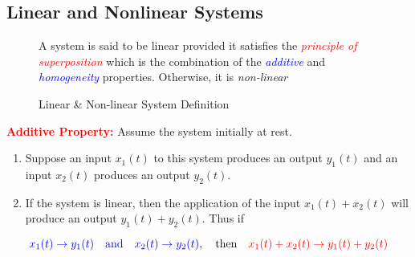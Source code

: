 \documentclass[a4paper,12pt]{report}
\begin{document}
\subsection{Linear and Nonlinear Systems}
\begin{figure}[H]
    \centering
    \begin{mdframed}
        \begin{center}
            A system is said to be linear provided it satisfies the \textcolor{red}{\emph{principle of superposition}} which is the combination of the \textcolor{blue}{\emph{additive}} and \textcolor{blue}{\emph{homogeneity}} properties. Otherwise, it is \emph{non-linear}
        \end{center}
    \end{mdframed}\label{fig:linear-nonlinear-system-def-1}
    \vspace{-1em}\caption{Linear \& Non-linear System Definition}
\end{figure}
\noindent \textcolor{red}{\textbf{Additive Property:}} Assume the system initially at rest.
\begin{enumerate}[label=\blacktriangleright, leftmargin=*, itemsep=0.5em]
    \item Suppose an input \(x_1(t)\) to this system produces an output \(y_1(t)\) and an input \(x_2(t)\) produces an output \(y_2(t)\).
    \item If the system is linear, then the application of the input \(x_1(t) + x_2(t)\) will produce an output \(y_1(t) + y_2(t)\). Thus if
\end{enumerate}
\[
    \textcolor{blue}{x_1(t) \rightarrow y_1(t) \quad \text{and} \quad x_2(t) \rightarrow y_2(t)}, \quad \text{then} \quad \textcolor{red}{x_1(t) + x_2(t) \rightarrow y_1(t) + y_2(t)}
\]
\end{document}

